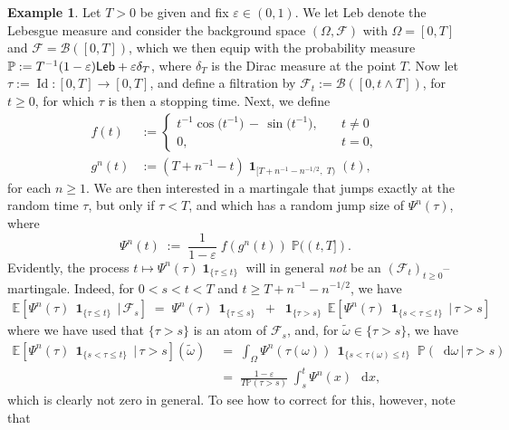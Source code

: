 \documentclass[11pt]{article}
\theoremstyle{definition}\newtheorem{example}[theorem]{Example}
\theoremstyle{definition}\newtheorem{counterexample}[theorem]{Counterexample}
\theoremstyle{definition}\newtheorem{remark}[theorem]{Remark}
\theoremstyle{definition}\newtheorem{defi}[theorem]{Definition}
\numberwithin{equation}{section}
\newcommand{\B}{\mathscr{B}}
\newcommand*\diff{\mathop{}\!\mathrm{d}}								%
\newcommand{\E}{\mathbb{E}}											%
\newcommand{\Pro}{\mathbb{P}}										%
\newcommand{\ind}{\operatorname{\mathbf{1}}}							%
\renewcommand{\|}{\; : \, \;}											%
\begin{document}
\begin{example}\label{ex:main_counterexample}
	Let $T>0$ be given and fix $\varepsilon\in(0,1)$. We let {\selectfont Leb} denote the Lebesgue measure and consider the background space $(\Omega, \mathcal{F})$ with $\Omega=[0,T]$ and $\mathcal{F}=\B([0,T])$, which we then equip with the probability measure $\Pro:= T^{-1}(1-\varepsilon)\text{{\fontfamily{cmss}\selectfont Leb}} + \varepsilon \delta_T$, where $\delta_{T}$ is the Dirac measure at the point $T$. Now let $\tau := \operatorname{Id}: [0,T] \to [0,T]$, and define a filtration by $\mathcal{F}_t:= \B([0,t\wedge T])$, for $t\ge 0$, for which $\tau$ is then a stopping time. Next, we define
\begin{align*} f(t)  &:= \begin{cases} 
		t^{-1} \cos \bigl(t^{-1} \bigr) \, - \, \sin\bigl(t^{-1} \bigr),  \quad & t \neq 0 \\
		0, \quad & t=0,
	\end{cases}\\
	g^n(t) &:= (T+ n^{-1} -t)\ind_{[T+n^{-1}-n^{-1/2},\,  \, T)}(t),
	\end{align*}
	for each $n\geq 1$. We are then interested in a martingale that jumps exactly at the random time $\tau$, but only if $\tau < T$, and which has a random jump size of $\Psi^n(\tau)$, where
	$$ \Psi^n(t) \; := \; \frac{1}{1-\varepsilon} \; f(g^n(t)) \; \Pro((t,T]).$$ Evidently, the process $t\mapsto \Psi^n(\tau) \ind_{\{\tau \le t\}}$ will in general \emph{not} be an $(\mathcal{F}_t)_{t\ge 0}$--martingale. Indeed, for $0<s<t<T$ and $t\ge T+n^{-1}-n^{-1/2}$, we have
	\begin{align*}
		\E \left[ \Psi^n(\tau)\, \ind_{\{\tau \le t\}} \, | \, \mathcal{F}_s \right] \; = \; \Psi^n(\tau)\, \ind_{\{\tau \le  s\}} \; + \; \ind_{\{\tau >s \}} \, \E \left[ \Psi^n(\tau)\, \ind_{\{s< \tau \le t\}} \, | \, \tau > s \right]
	\end{align*}
	where we have used that $\{\tau > s\}$ is an atom of $\mathcal{F}_s$, and, for $\tilde \omega \in \{\tau >s\}$, we have
	\begin{align*}
		\E \left[ \Psi^n(\tau)\, \ind_{\{s< \tau \le t\}} \, | \, \tau > s \right](\tilde \omega) \; &= \; \int_{\Omega} \Psi^n(\tau(\omega))\, \ind_{\{s< \tau(\omega) \le t\}} \; \Pro(\diff \omega\,  | \, \tau > s) \\
		&= \; \frac{1-\varepsilon}{ T \Pro(\tau>s)}\;  \int_s^t \Psi^n(x)\, \diff x,
	\end{align*}
	which is clearly not zero in general. To see how to correct for this, however, note that

\end{example}
\end{document}
